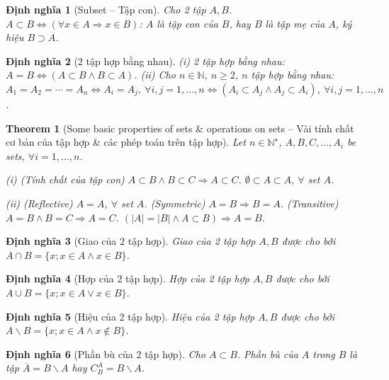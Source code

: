 \documentclass[oneside]{book}
\newtheorem{dinhnghia}{Định nghĩa}
\newtheorem{theorem}{Theorem}
\begin{document}
\begin{dinhnghia}[Subset -- Tập con]
	Cho 2 tập $A,B$. $A\subset B\Leftrightarrow(\forall x\in A\Rightarrow x\in B)$: $A$ là {\rm tập con} của $B$, hay $B$ là {\rm tập mẹ} của $A$, ký hiệu $B\supset A$.
\end{dinhnghia}

\begin{dinhnghia}[2 tập hợp bằng nhau]
	(i) 2 tập hợp bằng nhau: $A = B\Leftrightarrow(A\subset B\land B\subset A)$. (ii) Cho $n\in\mathbb{N}$, $n\ge2$, $n$ tập hợp bằng nhau: $A_1 = A_2 = \cdots = A_n\Leftrightarrow A_i = A_j,\ \forall i,j = 1,\ldots,n\Leftrightarrow(A_i\subset A_j\land A_j\subset A_i),\ \forall i,j = 1,\ldots,n$.
\end{dinhnghia}

\begin{theorem}[Some basic properties of sets \& operations on sets -- Vài tính chất cơ bản của tập hợp \& các phép toán trên tập hợp]
	Let $n\in\mathbb{N}^\star$, $A,B,C,\ldots,A_i$ be sets, $\forall i = 1,\ldots,n$.
	\item(i) {\rm(Tính chất của tập con)} $A\subset B\land B\subset C\Rightarrow A\subset C$. $\emptyset\subset A\subset A$, $\forall$ set $A$.
	\item(ii) (Reflective) $A = A$, $\forall$ set $A$. (Symmetric) $A = B\Rightarrow B = A$. (Transitive) $A = B\land B = C\Rightarrow A = C$. $(|A| = |B|\land A\subset B)\Rightarrow A = B$.
\end{theorem}

\begin{dinhnghia}[Giao của 2 tập hợp]
	{\rm Giao} của 2 tập hợp $A,B$ được cho bởi $A\cap B = \{x;x\in A\land x\in B\}$.
\end{dinhnghia}

\begin{dinhnghia}[Hợp của 2 tập hợp]
	{\rm Hợp} của 2 tập hợp $A,B$ được cho bởi $A\cup B = \{x;x\in A\lor x\in B\}$.
\end{dinhnghia}

\begin{dinhnghia}[Hiệu của 2 tập hợp]
	{\rm Hiệu} của 2 tập hợp $A,B$ được cho bởi $A\backslash B = \{x;x\in A\land x\notin B\}$.	
\end{dinhnghia}

\begin{dinhnghia}[Phần bù của 2 tập hợp]
	Cho $A\subset B$. {\rm Phần bù} của $A$ trong $B$ là tập $\overline{A} = B\backslash A$ hay $C_B^A = B\backslash A$.
\end{dinhnghia}
\end{document}
